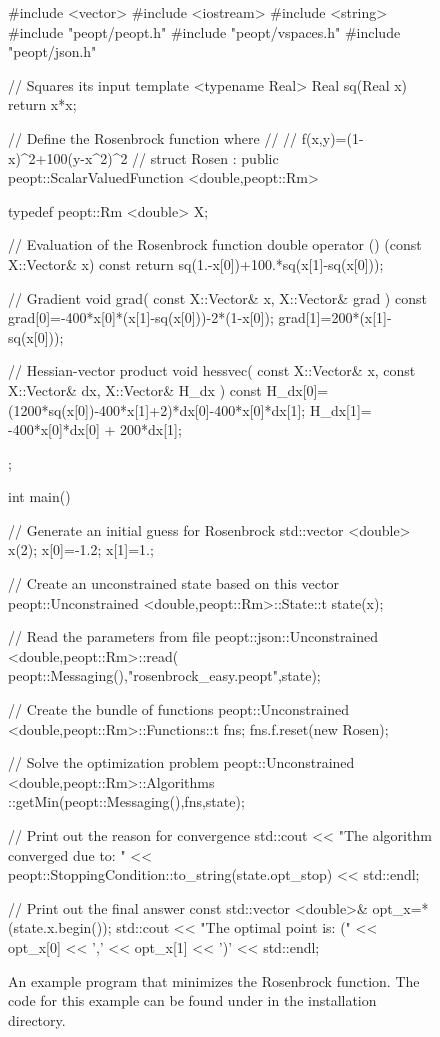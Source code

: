 \documentclass{report}
\begin{document}
\begin{figure}
\begin{lstCpp}
#include <vector>
#include <iostream>
#include <string>
#include "peopt/peopt.h"
#include "peopt/vspaces.h"
#include "peopt/json.h"

// Squares its input
template <typename Real>
Real sq(Real x){
    return x*x;
}

// Define the Rosenbrock function where
// 
// f(x,y)=(1-x)^2+100(y-x^2)^2
//
struct Rosen
    : public peopt::ScalarValuedFunction <double,peopt::Rm> 
{
    typedef peopt::Rm <double> X;

    // Evaluation of the Rosenbrock function
    double operator () (const X::Vector& x) const {
        return sq(1.-x[0])+100.*sq(x[1]-sq(x[0]));
    }

    // Gradient
    void grad(
        const X::Vector& x,
        X::Vector& grad
    ) const {
        grad[0]=-400*x[0]*(x[1]-sq(x[0]))-2*(1-x[0]);
        grad[1]=200*(x[1]-sq(x[0]));
    }

    // Hessian-vector product
    void hessvec(
        const X::Vector& x,
        const X::Vector& dx,
        X::Vector& H_dx
    ) const {
        H_dx[0]= (1200*sq(x[0])-400*x[1]+2)*dx[0]-400*x[0]*dx[1];
        H_dx[1]= -400*x[0]*dx[0] + 200*dx[1];
    }
};
\end{lstCpp}
\end{figure}
\begin{figure}
\ContinuedFloat
\begin{lstCpp}

int main(){

    // Generate an initial guess for Rosenbrock
    std::vector <double> x(2);
    x[0]=-1.2; x[1]=1.;

    // Create an unconstrained state based on this vector
    peopt::Unconstrained <double,peopt::Rm>::State::t state(x);

    // Read the parameters from file
    peopt::json::Unconstrained <double,peopt::Rm>::read(
        peopt::Messaging(),"rosenbrock_easy.peopt",state);

    // Create the bundle of functions 
    peopt::Unconstrained <double,peopt::Rm>::Functions::t fns;
    fns.f.reset(new Rosen);

    // Solve the optimization problem
    peopt::Unconstrained <double,peopt::Rm>::Algorithms
        ::getMin(peopt::Messaging(),fns,state);

    // Print out the reason for convergence
    std::cout << "The algorithm converged due to: " <<
        peopt::StoppingCondition::to_string(state.opt_stop) <<
        std::endl;

    // Print out the final answer
    const std::vector <double>& opt_x=*(state.x.begin());
    std::cout << "The optimal point is: (" << opt_x[0] << ','
        << opt_x[1] << ')' << std::endl;
}
\end{lstCpp}
\caption{An example program that minimizes the Rosenbrock function.  The code for this example can be found under \protect{} in the installation directory.}
\label{fig:Rosen}
\end{figure}
\end{document}
